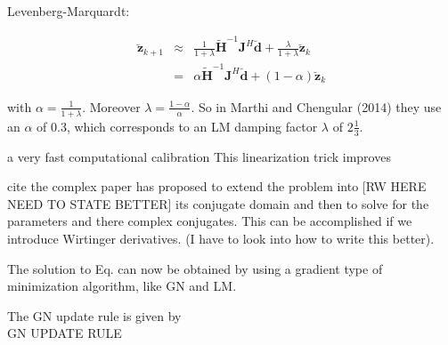 \documentclass[useAMS,usenatbib]{mn2e}
\begin{document}
Levenberg-Marquardt:

\begin{eqnarray}
\breve{\boldsymbol{z}}_{k+1} &\approx& \frac{1}{1+\lambda}\widetilde{\boldsymbol{H}}^{-1}\boldsymbol{J}^H\breve{\boldsymbol{d}} + \frac{\lambda}{1+\lambda} \breve{\boldsymbol{z}}_k\\
 &=& \alpha \widetilde{\boldsymbol{H}}^{-1}\boldsymbol{J}^H\breve{\boldsymbol{d}} + (1-\alpha)\breve{\boldsymbol{z}}_k 
\end{eqnarray}

with $\alpha = \frac{1}{1+\lambda}$. Moreover $\lambda = \frac{1-\alpha}{\alpha}$. So in Marthi and Chengular (2014) they use an $\alpha$ of 0.3, which corresponds to an LM damping factor $\lambda$
of $2\frac{1}{3}$.




a very fast computational calibration This linearization trick improves  



















cite the complex paper has proposed to extend the problem into [RW HERE NEED TO STATE BETTER] its conjugate domain and then to solve for the parameters and there complex conjugates. This can be accomplished
if we introduce Wirtinger derivatives. (I have to look into how to write this better).

The solution to Eq. can now be obtained by using a gradient type of minimization algorithm, like GN and LM. 

The GN update rule is given by\\

GN UPDATE RULE
\end{document}
